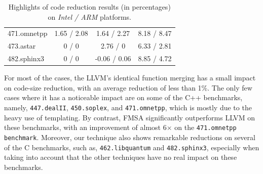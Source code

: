 \begin{table}[]
{\begin{tabular}{lccc}
471.omnetpp                               & 1.65 / 2.08        & 1.64 / 2.27   & 8.18 / 8.47             \\
\rowcolor{evencolor} 473.astar                                 & 0 / 0              & 2.76 / 0      & 6.33 / 2.81             \\
482.sphinx3                               & 0 / 0              & -0.06 / 0.06  & 8.85 / 4.72             \\
\bottomrule
\end{tabular}
}
\caption{Highlights of code reduction results (in percentages) on \textit{Intel / ARM} platforms. }
\end{table}


For most of the cases, the LLVM's identical function merging has a small impact on code-size reduction, with an average reduction of less
than 1\%. The only few cases where it has a noticeable impact are on some of the C++ benchmarks, namely, \texttt{447.dealII},
\texttt{450.soplex}, and \texttt{471.omnetpp}, which is mostly
due to the heavy use of templating. %
By contrast, FMSA significantly outperforms LLVM on these benchmarks, with an improvement of almost 6$\times$ on the \texttt{471.omnetpp
benchmark}. Moreover, our technique also shows remarkable reductions on several of the C benchmarks, such as, \texttt{462.libquantum} and
\texttt{482.sphinx3}, especially when taking into account that the other techniques have no real impact on these benchmarks.


